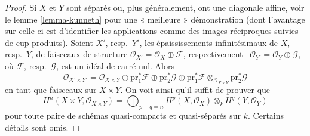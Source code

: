 \begin{proof}
 Si $X$ et $Y$ sont séparés ou, plus généralement, ont une diagonale affine, voir
le lemme \ref{lemma-kunneth} pour une « meilleure » démonstration
(dont l'avantage sur celle-ci est d'identifier les
applications comme des images réciproques suivies de cup-produits). Soient
$X'$, resp.\ $Y'$, les épaississements infinitésimaux de $X$, resp.\ $Y$,
de faisceaux de structure 
$\mathcal{O}_{X'} = \mathcal{O}_X \oplus \mathcal{F}$,
respectivement \ $\mathcal{O}_{Y'} = \mathcal{O}_Y \oplus \mathcal{G}$, où 
$\mathcal{F}$, resp.\ $\mathcal{G}$, est un idéal de carré nul.
Alors 
$$
\mathcal{O}_{X' \times Y'} =
\mathcal{O}_{X \times Y}
\oplus \text{pr}_1^*\mathcal{F}
\oplus \text{pr}_2^*\mathcal{G}
\oplus \text{pr}_1^*\mathcal{F}
\otimes_{\mathcal{O}_{X \times Y}} \text{pr}_2^*\mathcal{G}
$$
 en tant que faisceaux sur $X \times Y$. On voit ainsi qu'il suffit de
prouver que 
$$
H^n(X \times Y, \mathcal{O}_{X \times Y}) =
\bigoplus\nolimits_{p + q = n}
H^p(X, \mathcal{O}_X) \otimes_k H^q(Y, \mathcal{O}_Y)
$$
 pour toute paire de schémas quasi-compacts et quasi-séparés sur $k$.
Certains détails sont omis.


\end{proof}
